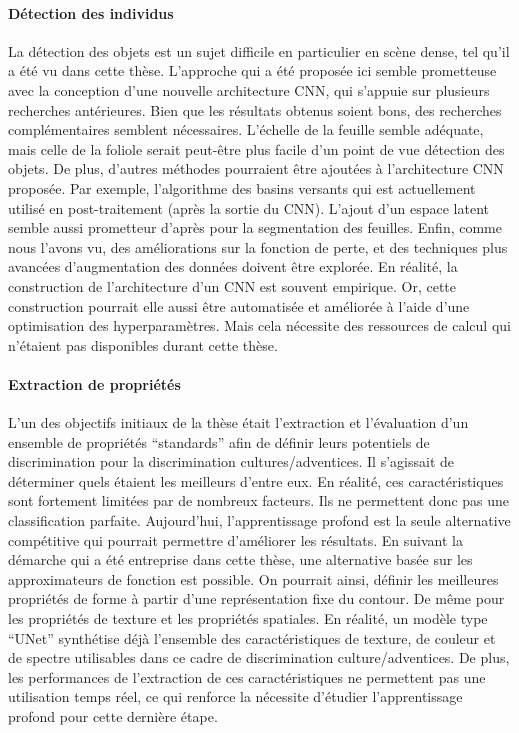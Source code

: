 \documentclass[../thesis.tex]{subfiles}
\begin{document}
    \paragraph{Détection des individus} La détection des objets est un sujet difficile en particulier en scène dense, tel qu'il a été vu dans cette thèse. L'approche qui a été proposée ici semble prometteuse avec la conception d'une nouvelle architecture CNN, qui s'appuie sur plusieurs recherches antérieures. Bien que les résultats obtenus soient bons, des recherches complémentaires semblent nécessaires. L'échelle de la feuille semble adéquate, mais celle de la foliole serait peut-être plus facile d'un point de vue détection des objets. De plus, d'autres méthodes pourraient être ajoutées à l'architecture CNN proposée. Par exemple, l'algorithme des basins versants \cite{8099788} qui est actuellement utilisé en post-traitement (après la sortie du CNN). L'ajout d'un espace latent semble aussi prometteur d'après \cite{kulikov2018instance} pour la segmentation des feuilles. Enfin, comme nous l'avons vu, des améliorations sur la fonction de perte, et des techniques plus avancées d'augmentation des données doivent être explorée. En réalité, la construction de l'architecture d'un CNN est souvent empirique. Or, cette construction pourrait elle aussi être automatisée et améliorée à l'aide d'une optimisation des hyperparamètres. Mais cela nécessite des ressources de calcul qui n'étaient pas disponibles durant cette thèse.
    
    \paragraph{Extraction de propriétés} L'un des objectifs initiaux de la thèse était l'extraction et l'évaluation d'un ensemble de propriétés ``standards'' afin de définir leurs potentiels de discrimination pour la discrimination cultures/adventices. Il s'agissait de déterminer quels étaient les meilleurs d'entre eux. En réalité, ces caractéristiques sont fortement limitées par de nombreux facteurs. Ils ne permettent donc pas une classification parfaite. Aujourd'hui, l'apprentissage profond est la seule alternative compétitive qui pourrait permettre d'améliorer les résultats. En suivant la démarche qui a été entreprise dans cette thèse, une alternative basée sur les approximateurs de fonction est possible. On pourrait ainsi, définir les meilleures propriétés de forme à partir d'une représentation fixe du contour. De même pour les propriétés de texture et les propriétés spatiales. En réalité, un modèle type ``UNet'' synthétise déjà l'ensemble des caractéristiques de texture, de couleur et de spectre utilisables dans ce cadre de discrimination culture/adventices. De plus, les performances de l'extraction de ces caractéristiques ne permettent pas une utilisation temps réel, ce qui renforce la nécessite d'étudier l'apprentissage profond pour cette dernière étape.
    
\end{document}
